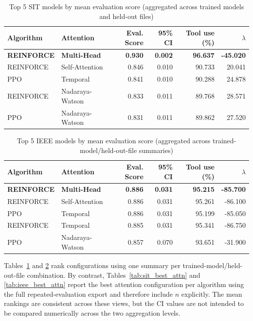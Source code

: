 \documentclass[sn-vancouver-num]{sn-jnl}%
\begin{document}
\begin{table}
\caption{Top 5 SIT models by mean evaluation score (aggregated across trained models and held-out files)}
\label{tab:sit_top10}
\begin{tabular}{ll r r r r}
\toprule
\textbf{Algorithm} & \textbf{Attention} & \textbf{Eval. Score} & \textbf{95\% CI} & \textbf{Tool use (\%)} & \textbf{$\lambda$}\\
\midrule
    \textbf{REINFORCE} & \textbf{Multi-Head} & \textbf{0.930} & \textbf{0.002} & \textbf{96.637} & \textbf{-45.020} \\
    REINFORCE & Self-Attention & 0.846 & 0.010 & 90.733 & 20.041 \\
    PPO & Temporal & 0.841 & 0.010 & 90.288 & 24.878 \\
    REINFORCE & Nadaraya-Watson & 0.833 & 0.011 & 89.768 & 28.571 \\
    PPO & Nadaraya-Watson & 0.831 & 0.011 & 89.862 & 27.520 \\
    \bottomrule
\end{tabular}
\end{table}


\begin{table}[htbp]
	\centering
	\caption{Top 5 IEEE models by mean evaluation score (aggregated across trained-model/held-out-file summaries)}
	\label{tab:ieee_top10}
	\begin{tabular}{ll r r r r}
	\toprule
	\textbf{Algorithm} & \textbf{Attention} & \textbf{Eval. Score} & \textbf{95\% CI} & \textbf{Tool use (\%)} & \textbf{$\lambda$}\\
	\midrule
	\textbf{REINFORCE} & \textbf{Multi-Head} & \textbf{0.886} & \textbf{0.031} & \textbf{95.215} & \textbf{-85.700}\\
	REINFORCE & Self-Attention 	& 0.886 & 0.031 & 95.261 & -86.100\\
	PPO & Temporal 				& 0.886 & 0.031 & 95.199 & -85.050\\
	REINFORCE & Temporal 		& 0.885 & 0.031 & 95.341 & -86.750\\
	PPO & Nadaraya-Watson 	& 0.857 & 0.070 & 93.651 & -31.900\\
	\bottomrule
	\end{tabular}
\end{table}

Tables~\ref{tab:sit_top10} and \ref{tab:ieee_top10} rank configurations using one summary per trained-model/held-out-file combination. By contrast, Tables~\ref{tab:sit_best_attn} and \ref{tab:ieee_best_attn} report the best attention configuration per algorithm using the full repeated-evaluation export and therefore include $n$ explicitly. The mean rankings are consistent across these views, but the CI values are not intended to be compared numerically across the two aggregation levels.
\end{document}
